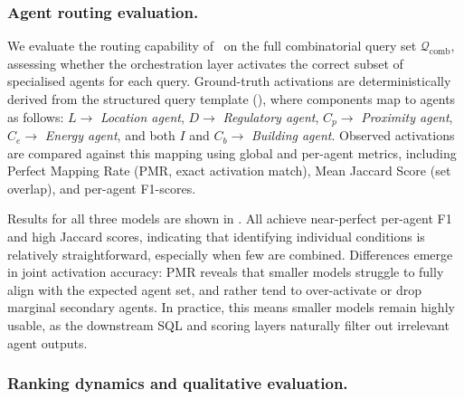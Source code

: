 \documentclass[runningheads,orivec]{llncs}
\newcommand{\locationagent}{\textit{Location agent}}
\newcommand{\energyagent}{\textit{Energy agent}}
\newcommand{\proximityagent}{\textit{Proximity agent}}
\newcommand{\regulatoryagent}{\textit{Regulatory agent}}
\newcommand{\buildingagent}{\textit{Building agent}}
\begin{document}
\subsubsection{Agent routing evaluation.}
\label{sec:routing}

We evaluate the routing capability of \methodACR\ on the full combinatorial query set $\mathcal{Q}_{\mathrm{comb}}$, assessing whether the orchestration layer activates the correct subset of specialised agents for each query. Ground-truth activations are deterministically derived from the structured query template (), where components map to agents as follows: \(L \rightarrow\) \locationagent, \(D \rightarrow\) \regulatoryagent, \(C_p \rightarrow\) \proximityagent, \(C_e \rightarrow\) \energyagent, and both \(I\) and \(C_b \rightarrow\) \buildingagent. Observed activations are compared against this mapping using global and per-agent metrics, including Perfect Mapping Rate (PMR, exact activation match), Mean Jaccard Score (set overlap), and per-agent F1-scores. 

Results for all three models are shown in . All achieve near-perfect per-agent F1 and high Jaccard scores, indicating that identifying individual conditions is relatively straightforward, especially when few are combined. Differences emerge in joint activation accuracy: PMR reveals that smaller models struggle to fully align with the expected agent set, and rather tend to over-activate or drop marginal secondary agents. In practice, this means smaller models remain highly usable, as the downstream SQL and scoring layers naturally filter out irrelevant agent outputs.


\subsubsection{Ranking dynamics and qualitative evaluation.}
\end{document}
